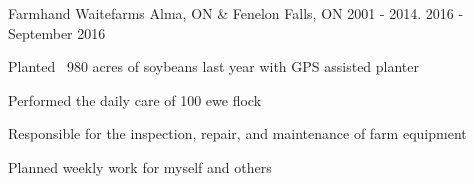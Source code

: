 \begin{cventries}
  \cventry
    {Farmhand} %
    {Waitefarms} %
    {Alma, ON \& Fenelon Falls, ON}
    {2001 - 2014. 2016 - September 2016} %
    {
      \begin{cvitems} %
        \item {Planted ~980 acres of soybeans last year with GPS assisted planter}
        \item {Performed the daily care of 100 ewe flock}
        \item {Responsible for the inspection, repair, and maintenance of farm equipment}
        \item {Planned weekly work for myself and others}
      \end{cvitems}
    }

\end{cventries}
